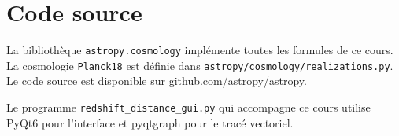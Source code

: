 \documentclass[11pt,a4paper,openany]{report}
\begin{document}
\section{Code source}

La bibliothèque \texttt{astropy.cosmology} implémente toutes les formules de
ce cours. La cosmologie \texttt{Planck18} est définie dans
\texttt{astropy/cosmology/realizations.py}. Le code source est disponible
sur \href{https://github.com/astropy/astropy}{github.com/astropy/astropy}.

Le programme \texttt{redshift\_distance\_gui.py} qui accompagne ce cours
utilise PyQt6 pour l'interface et pyqtgraph pour le tracé vectoriel.

\end{document}
